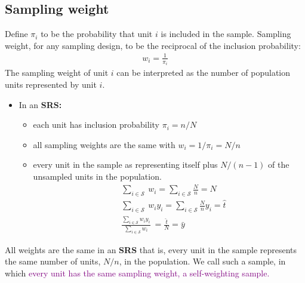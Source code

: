 \documentclass[a4paper,twoside,11pt]{article}
\begin{document}
\subsection{Sampling weight}
Define $\pi_i$ to be the probability that unit $i$ is included in the sample. 
\newline
\newline
Sampling weight, for any sampling design, to be the reciprocal of the inclusion probability:
\begin{equation*}
\begin{aligned}
w_i = \frac{1}{\pi_i}
\end{aligned}
\end{equation*}
The sampling weight of unit $i$ can be interpreted as the number of population units represented by unit $i$.
\begin{itemize}
    \item In an \textbf{SRS:}
    \begin{itemize}
        \item each unit has inclusion probability $\pi_i = n/N$
        \item all sampling weights are the same with $w_i = 1/ \pi_i = N/n$
        \item every unit in the sample as representing itself plus $N/(n-1)$ of the unsampled units in the population.
\newline
\begin{equation*}
\begin{aligned}
& \ \sum_{i \in \mathcal{S}} \  w_i = \sum_{i \in \mathcal{S}} \frac{N}{n} = N \\
& \ \sum_{i \in \mathcal{S}} \  w_i y_i = \sum_{i \in \mathcal{S}} \frac{N}{n} y_i = \hat{t} \\
& \ \frac{\sum_{i \in \mathcal{S}}w_i y_i }{\sum_{i \in \mathcal{S}} w_i} \  = \frac{\hat{t}}{N} = \bar{y}
\end{aligned}
\end{equation*}
    \end{itemize}
\end{itemize}
\noindent All weights are the same in an \textbf{SRS} that is, every unit in the sample represents the same number of units, $N/n$, in the population. We call such a sample, in which \textcolor{Purple}{every unit has the same sampling weight, a self-weighting sample.}
\end{document}
